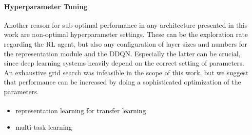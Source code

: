 \paragraph{Hyperparameter Tuning} Another reason for sub-optimal performance in any architecture presented in this work are non-optimal hyperparameter settings. These can be the exploration rate regarding the RL agent, but also any configuration of layer sizes and numbers for the representation module and the DDQN. Especially the latter can be crucial, since deep learning systems heavily depend on the correct setting of parameters. An exhaustive grid search was infeasible in the scope of this work, but we suggest that performance can be increased by doing a sophisticated optimization of the parameters.

\paragraph{}

\begin{itemize}
	\item representation learning for transfer learning
	\item multi-task learning
\end{itemize}
